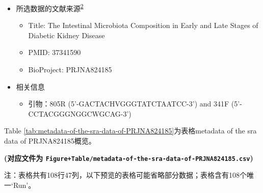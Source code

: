 \documentclass[
]{article}
\providecommand{\tightlist}{%
  \setlength{\itemsep}{0pt}\setlength{\parskip}{0pt}}
\begin{document}
\begin{itemize}
\tightlist
\item
  所选数据的文献来源\textsuperscript{\protect\hyperlink{ref-TheIntestinalZhang2023}{2}}

  \begin{itemize}
  \tightlist
  \item
    Title: The Intestinal Microbiota Composition in Early and Late Stages of Diabetic Kidney Disease
  \item
    PMID: 37341590
  \item
    BioProject: PRJNA824185
  \end{itemize}
\item
  相关信息

  \begin{itemize}
  \tightlist
  \item
    引物：805R (5'-GACTACHVGGGTATCTAATCC-3') and 341F (5'-CCTACGGGNGGCWGCAG-3')
  \end{itemize}
\end{itemize}

Table \ref{tab:metadata-of-the-sra-data-of-PRJNA824185}为表格metadata of the sra data of PRJNA824185概览。

\textbf{(对应文件为 \texttt{Figure+Table/metadata-of-the-sra-data-of-PRJNA824185.csv})}

\begin{center}\begin{tcolorbox}[colback=gray!10, colframe=gray!50, width=0.9\linewidth, arc=1mm, boxrule=0.5pt]注：表格共有108行47列，以下预览的表格可能省略部分数据；表格含有108个唯一`Run'。
\end{tcolorbox}
\end{center}
\end{document}
